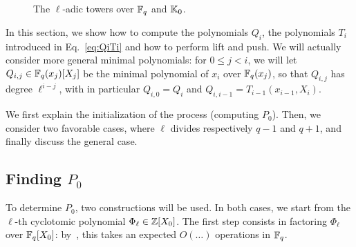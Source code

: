 \documentclass{sig-alternate}
\newcommand{\Cyc}{\Phi}  %
\begin{document}
\begin{figure}[h]
  \centering
  \caption{The $\ell$-adic towers over $\mathbb{F}_q$ and $\mathbb{K}_0$.}
  \label{fig:ladic}
\end{figure}

In this section, we show how to compute the polynomials $Q_i$, the
polynomials $T_i$ introduced in Eq.~\eqref{eq:QiTi} and how to perform
lift and push. We will actually consider more general minimal
polynomials: for $0 \le j < i$, we will let $Q_{i,j} \in
\mathbb{F}_q(x_j)[X_j]$ be the minimal polynomial of $x_i$ over $\mathbb{F}_q(x_j)$,
so that $Q_{i,j}$ has degree $\ell^{i-j}$, with in particular
$Q_{i,0}=Q_i$ and $Q_{i,i-1}=T_{i-1}(x_{i-1},X_i)$.

We first explain the initialization of the process (computing
$P_0$). Then, we consider two favorable cases, where $\ell$ divides
respectively $q-1$ and $q+1$, and finally discuss the general case.



\subsection{Finding $P_0$}

To determine $P_0$, two constructions will be used. In both cases, we
start from the $\ell$-th cyclotomic polynomial $\Cyc_\ell \in
\Z[X_0]$. The first step consists in factoring $\Cyc_\ell$ over
$\mathbb{F}_q[X_0]$: by~\cite[XXX]{shoup94}, this takes an expected $O(\dots)$
operations in $\mathbb{F}_q$.
\end{document}
